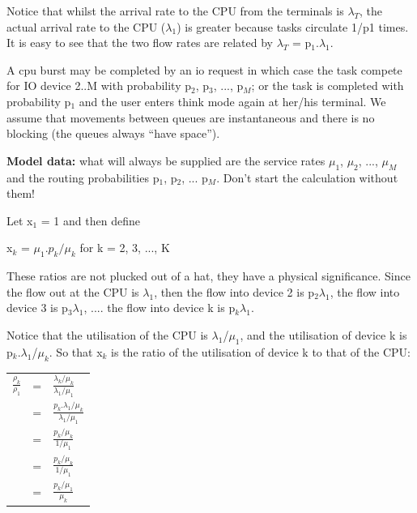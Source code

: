 \documentclass[12pt,fleqn]{report}
\begin{document}
\noindent
Notice that whilst the arrival rate to the CPU from the terminals is
$\lambda_T$, the actual arrival rate to the CPU ($\lambda_1$)
is greater because tasks circulate 1/p1 times. 
It is easy to see that the two flow rates are related
by $\lambda_T$ = p$_1$.$\lambda_1$.


A cpu burst may be completed by an io request
in which case the task compete for IO device 2..M with probability 
p$_2$, p$_3$, ..., p$_M$; or the task is completed
with probability p$_1$ and the user enters think mode again at 
her/his terminal.
We assume that movements between queues are instantaneous and
there is no blocking (the queues always ``have space'').

\noindent
{\bf Model data:} what will always be supplied are the 
service rates $\mu_1$, $\mu_2$, ..., $\mu_M$ and
the routing probabilities p$_1$, p$_2$, ... p$_M$.
Don't start the calculation without them!


Let x$_1$ = 1 and then define

\begin{center}
x$_k$ = $\mu_1.p_k/\mu_k$ for k = 2, 3, ..., K
\end{center}

\noindent
These ratios are not plucked out of a hat,
they have a physical significance. Since the flow out at
the CPU is $\lambda_1$,
then the flow into device 2 is p$_2$$\lambda_1$,
the flow into device 3 is p$_3$$\lambda_1$, 
.... the flow into device k is p$_k$$\lambda_1$.

Notice that the utilisation of the CPU is $\lambda_1$/$\mu_1$,
and the utilisation of device k is p$_k$.$\lambda_1$/$\mu_k$.
So that x$_k$ is the ratio of the utilisation of device
k to that of the CPU:

{\large
\begin{center}
\begin{tabular} { r c l}
$\frac{\rho_k}{\rho_1}$ & = & $\frac{\lambda_k/\mu_k}{\lambda_1/\mu_1}$ \\
                       & = & $\frac{p_k.\lambda_1/\mu_k}{\lambda_1/\mu_1}$ \\
                       & = & $\frac{p_k/\mu_k}{1/\mu_1}$ \\
                       & = & $\frac{p_k/\mu_k}{1/\mu_1}$ \\
                       & = & $\frac{p_k/\mu_1}{\mu_k}$ \\
\end{tabular}
\end{center}}
\end{document}
